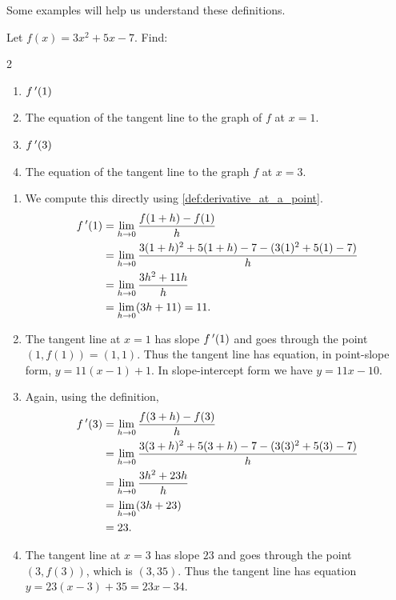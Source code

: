 
Some examples will help us understand these definitions.

\begin{example}\label{ex_derv_point1}%
Let $f(x) = 3x^2+5x-7$. Find: 
\begin{multicols}{2}
	\begin{enumerate}
	\item		$f\,'(1)$
	\item		The equation of the tangent line to the graph of $f$ at $x=1$.
	\item		$f\,'(3)$
	\item		The equation of the tangent line to the graph $f$ at $x=3$.
	\end{enumerate}
	\end{multicols}
\solution
	\begin{enumerate}
	\item We compute this directly using \autoref{def:derivative_at_a_point}.
		\begin{align*}
			\fp(1) &= \lim_{h\to 0} \frac{f(1+h)-f(1)}{h} \\
				   &= \lim_{h\to 0} \frac{3(1+h)^2+5(1+h)-7 - (3(1)^2+5(1)-7)}{h}\\
				   &= \lim_{h\to 0} \frac{3h^2+11h}{h}\\
				   &= \lim_{h\to 0}(3h+11)=11.%
		\end{align*}
	\item The tangent line at $x=1$ has slope $f\,'(1)$ and goes through the point $(1,f(1)) = (1,1)$. Thus the tangent line has equation, in point-slope form, $y = 11(x-1) + 1$. In slope-intercept form we have $y = 11x-10$.
	\item Again, using the definition,
		\begin{align*}
			f\,'(3) &= \lim_{h\to 0} \frac{f(3+h)-f(3)}{h} \\
				   &= \lim_{h\to 0} \frac{3(3+h)^2+5(3+h)-7 - (3(3)^2+5(3)-7)}{h} \\
				   &= \lim_{h\to 0} \frac{3h^2+23h}{h}\\
				   &= \lim_{h\to 0}(3h+23)\\
				   &= 23.
		\end{align*}
	\item The tangent line at $x=3$ has slope $23$ and goes through the point $(3,f(3))$, which is $(3,35)$. Thus the tangent line has equation $y=23(x-3)+35 = 23x-34$.
	\end{enumerate}


\end{example}
